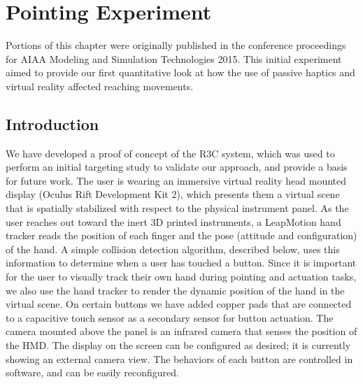 \chapter{Pointing Experiment}
\label{chap:pointing}

Portions of this chapter were originally published in the conference proceedings for AIAA Modeling and Simulation Technologies 2015\cite{joyce_rapidly_2015}.
This initial experiment aimed to provide our first quantitative look at how the use of passive haptics and virtual reality affected reaching movements.

\section{Introduction}

We have developed a proof of concept of the R3C system, which was used to perform an initial targeting study to validate our approach, and provide a basis for future work.
The user is wearing an immersive virtual reality head mounted display (Oculus Rift Development Kit 2), which presents them a virtual scene that is spatially stabilized with respect to the physical instrument panel.
As the user reaches out toward the inert 3D printed instruments, a LeapMotion hand tracker reads the position of each finger and the pose (attitude and configuration) of the hand.
A simple collision detection algorithm, described below, uses this information to determine when a user has touched a button.
Since it is important for the user to visually track their own hand during pointing and actuation tasks, we also use the hand tracker to render the dynamic position of the hand in the virtual scene.
On certain buttons we have added copper pads that are connected to a capacitive touch sensor as a secondary sensor for button actuation.
The camera mounted above the panel is an infrared camera that senses the position of the HMD.
The display on the screen can be configured as desired; it is currently showing an external camera view.
The behaviors of each button are controlled in software, and can be easily reconfigured.

